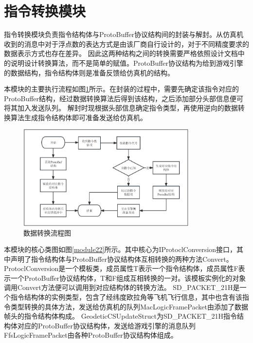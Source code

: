 \section{指令转换模块}
指令转换模块负责指令结构体与ProtoBuffer协议结构间的封装与解封。从仿真机收到的消息中对于浮点数的表达方式是由该厂商自行设计的，对于不同精度要求的数据表示方式也存在差异。
因此这两种结构之间的转换需要严格依照设计文档中的说明设计转换算法，而不是简单的赋值。ProtoBuffer协议结构为给到游戏引擎的数据结构，指令结构体则是准备反馈给仿真机的结构。
\par
本模块的主要执行流程如图\ref{module21}所示。在封装的过程中，需要先确定该指令对应的ProtoBuffer结构，经过数据转换算法后得到该结构，之后添加部分头部信息便可将其加入发送队列。
解封时现根据头部信息确定指令类型，再使用逆向的数据转换算法生成指令结构体即可准备发送给仿真机。

\begin{figure}[h!]
    \begin{center}
        \includegraphics[width=0.8\textwidth]{pictures/flowchart2.pdf}
        \caption{数据转换流程图}
        \label{module21}
    \end{center}
\end{figure}
\par
本模块的核心类图如图\ref{module22}所示。其中核心为IProtoclConversion接口，其中声明了指令结构体与ProtoBuffer协议结构体互相转换的两种方法Convert。
ProtoclConversion是一个模板类，成员属性T表示一个指令结构体，成员属性F表示一个ProtoBuffer协议结构体，T和F组成互相转换的一对。该模板实例化的对象调用Convert方法便可以调用到对应结构体的转换方法。
SD\_PACKET\_21H是一个指令结构体的实例类型，包含了经纬度欧拉角等飞机飞行信息，其中也含有该指令类型转换的具体方法，发送给仿真机的队列MacLogicFramePacket由添加了数据帧头的指令结构体构成。
GeodeticCSUpdateStruct为SD\_PACKET\_21H指令结构体对应的ProtoBuffer协议结构体，发送给游戏引擎的消息队列FfsLogicFramePacket由各种ProtoBuffer协议结构体组成。

